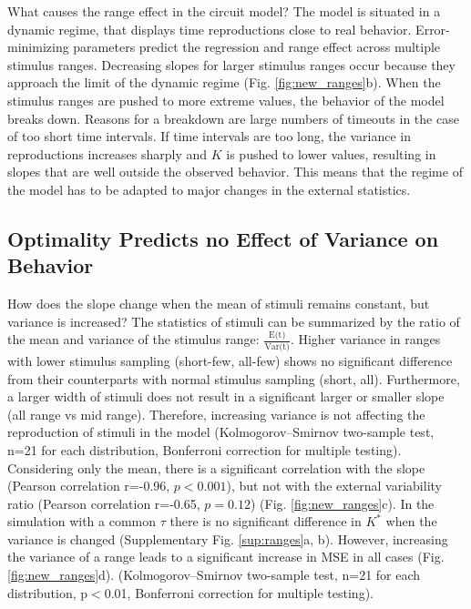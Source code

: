 \documentclass[10pt]{article}
\begin{document}
\noindent What causes the range effect in the circuit model?
The model is situated in a dynamic regime, that displays time reproductions close to real behavior.
Error-minimizing parameters predict the regression and range effect across multiple stimulus ranges.
Decreasing slopes for larger stimulus ranges occur because they approach the limit of the dynamic regime (Fig. \ref{fig:new_ranges}b).
When the stimulus ranges are pushed to more extreme values, the behavior of the model breaks down. Reasons for a breakdown are large numbers of timeouts in the case of too short time intervals. If time intervals are too long, the variance in reproductions increases sharply and $K$ is pushed to lower values, resulting in slopes that are well outside the observed behavior. 
This means that the regime of the model has to be adapted to major changes in the external statistics. 

\subsection{Optimality Predicts no Effect of Variance on Behavior}
How does the slope change when the mean of stimuli remains constant, but variance is increased?
The statistics of stimuli can be summarized by the ratio of the mean and variance of the stimulus range: $\frac{\text{E(t)}}{\text{Var(t)}}$.
Higher variance in ranges with lower stimulus sampling (short-few, all-few) shows no significant difference from their counterparts with normal stimulus sampling (short, all).
Furthermore, a larger width of stimuli does not result in a significant larger or smaller slope (all range vs mid range).
Therefore, increasing variance is not affecting the reproduction of stimuli in the model (Kolmogorov–Smirnov two-sample test, n=21 for each distribution, Bonferroni correction for multiple testing).
Considering only the mean, there is a significant correlation with the slope (Pearson correlation r=-0.96, $p<0.001$), but not with the external variability ratio (Pearson correlation r=-0.65, $p=0.12$) (Fig. \ref{fig:new_ranges}c).
In the simulation with a common $\tau$ there is no significant difference in $K^*$ when the variance is changed (Supplementary Fig. \ref{sup:ranges}a, b).
However, increasing the variance of a range leads to a significant increase in MSE in all cases (Fig. \ref{fig:new_ranges}d).  
(Kolmogorov–Smirnov two-sample test, n=21 for each distribution, p$<$0.01, Bonferroni correction for multiple testing).
\end{document}
